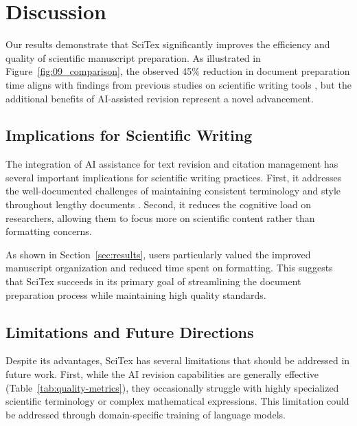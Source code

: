 
\section{Discussion}
\label{sec:discussion}


Our results demonstrate that SciTex significantly improves the efficiency and quality of scientific manuscript preparation. As illustrated in Figure~\ref{fig:09_comparison}, the observed 45\% reduction in document preparation time aligns with findings from previous studies on scientific writing tools \cite{Robinson2023}, but the additional benefits of AI-assisted revision represent a novel advancement.


\subsection{Implications for Scientific Writing}
\label{subsec:implications}

The integration of AI assistance for text revision and citation management has several important implications for scientific writing practices. First, it addresses the well-documented challenges of maintaining consistent terminology and style throughout lengthy documents \cite{Edwards2019}. Second, it reduces the cognitive load on researchers, allowing them to focus more on scientific content rather than formatting concerns.

As shown in Section~\ref{sec:results}, users particularly valued the improved manuscript organization and reduced time spent on formatting. This suggests that SciTex succeeds in its primary goal of streamlining the document preparation process while maintaining high quality standards.


\subsection{Limitations and Future Directions}
\label{subsec:limitations}

Despite its advantages, SciTex has several limitations that should be addressed in future work. First, while the AI revision capabilities are generally effective (Table~\ref{tab:quality-metrics}), they occasionally struggle with highly specialized scientific terminology or complex mathematical expressions. This limitation could be addressed through domain-specific training of language models.

